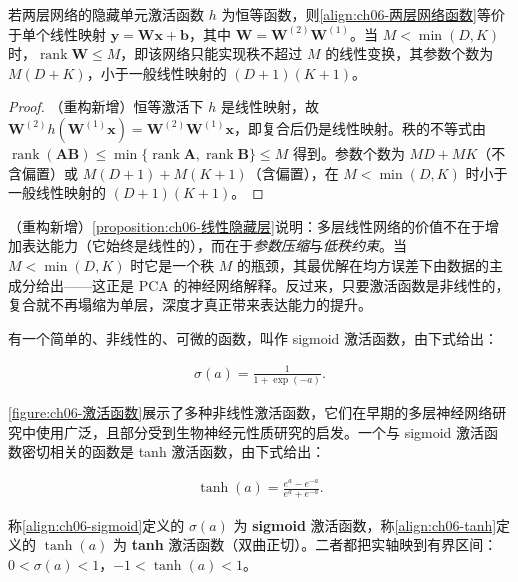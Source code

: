 \documentclass[../../main.tex]{subfiles}
\begin{document}
\begin{proposition}[线性隐藏单元的等价性]\label{proposition:ch06-线性隐藏层}
若两层网络的隐藏单元激活函数 $h$ 为恒等函数，则\eqref{align:ch06-两层网络函数}等价于单个线性映射 $\boldsymbol{y}=\boldsymbol{W}\boldsymbol{x}+\boldsymbol{b}$，其中 $\boldsymbol{W}=\boldsymbol{W}^{(2)}\boldsymbol{W}^{(1)}$。当 $M<\min(D,K)$ 时，$\operatorname{rank}\boldsymbol{W}\leqslant M$，即该网络只能实现秩不超过 $M$ 的线性变换，其参数个数为 $M(D+K)$，小于一般线性映射的 $(D+1)(K+1)$。
\end{proposition}

\begin{proof}
（重构新增）恒等激活下 $h$ 是线性映射，故 $\boldsymbol{W}^{(2)}h(\boldsymbol{W}^{(1)}\boldsymbol{x})=\boldsymbol{W}^{(2)}\boldsymbol{W}^{(1)}\boldsymbol{x}$，即复合后仍是线性映射。秩的不等式由 $\operatorname{rank}(\boldsymbol{A}\boldsymbol{B})\leqslant\min\{\operatorname{rank}\boldsymbol{A},\operatorname{rank}\boldsymbol{B}\}\leqslant M$ 得到。参数个数为 $MD+MK$（不含偏置）或 $M(D+1)+M(K+1)$（含偏置），在 $M<\min(D,K)$ 时小于一般线性映射的 $(D+1)(K+1)$。
\end{proof}

\begin{remark}（重构新增）\cref{proposition:ch06-线性隐藏层}说明：多层线性网络的价值不在于增加表达能力（它始终是线性的），而在于\emph{参数压缩}与\emph{低秩约束}。当 $M<\min(D,K)$ 时它是一个秩 $M$ 的瓶颈，其最优解在均方误差下由数据的主成分给出——这正是 PCA 的神经网络解释。反过来，只要激活函数是非线性的，复合就不再塌缩为单层，深度才真正带来表达能力的提升。
\end{remark}

有一个简单的、非线性的、可微的函数，叫作 sigmoid 激活函数，由下式给出：

\begin{align}
\sigma(a)=\frac{1}{1+\exp(-a)}.
\label{align:ch06-sigmoid}
\end{align}

\cref{figure:ch06-激活函数}展示了多种非线性激活函数，它们在早期的多层神经网络研究中使用广泛，且部分受到生物神经元性质研究的启发。一个与 sigmoid 激活函数密切相关的函数是 tanh 激活函数，由下式给出：

\begin{align}
\tanh(a)=\frac{e^{a}-e^{-a}}{e^{a}+e^{-a}}.
\label{align:ch06-tanh}
\end{align}

\begin{definition}\label{definition:ch06-sigmoid-tanh}
称\eqref{align:ch06-sigmoid}定义的 $\sigma(a)$ 为 \textbf{sigmoid} 激活函数，称\eqref{align:ch06-tanh}定义的 $\tanh(a)$ 为 \textbf{tanh} 激活函数（双曲正切）。二者都把实轴映到有界区间：$0<\sigma(a)<1$，$-1<\tanh(a)<1$。
\end{definition}
\end{document}
